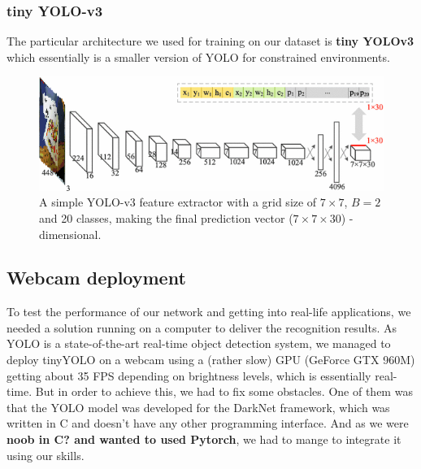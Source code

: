 \documentclass[a4paper]{article}
\begin{document}
\subsubsection*{tiny YOLO-v3}

The particular architecture we used for training on our dataset is \textbf{tiny YOLOv3} which essentially is a smaller version of YOLO for constrained environments.
\begin{figure}


\includegraphics[width=1\linewidth]{images/tinyyolo}
\caption{A simple YOLO-v3 feature extractor with a grid size of $7\times 7$, $B=2$ and 20 classes, making the final prediction vector ($7 \times 7 \times 30$) - dimensional. }
\end{figure}

\subsection{Webcam deployment}
To test the performance of our network and getting into real-life applications, we needed a solution running on a computer to deliver the recognition results. As YOLO is a state-of-the-art real-time object detection system, we managed to deploy tinyYOLO on a webcam using a (rather slow) GPU (GeForce GTX 960M) getting about 35 FPS depending on brightness levels, which is essentially real-time.  But in order to achieve this, we had to fix some obstacles.  One of them was that the YOLO model was developed for the DarkNet framework, which was written in C and doesn't have any other programming interface.  And as we were \textbf{noob in C? and wanted to used Pytorch}, we had to mange to integrate it using our skills. \\
\end{document}
